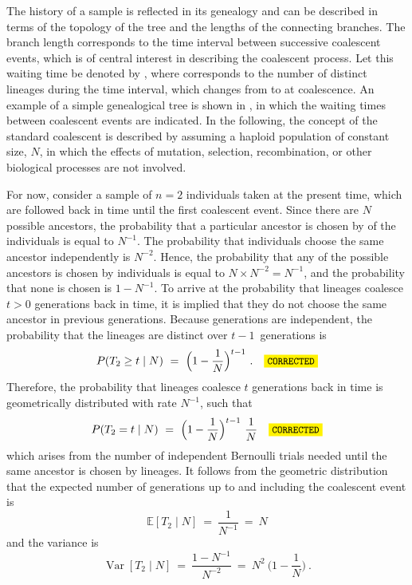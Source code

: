 %

%

The history of a sample is reflected in its genealogy and can be described in terms of the topology of the tree and the lengths of the connecting branches.
The branch length corresponds to the time interval between  successive coalescent events, which is of central interest in describing the coalescent process.
Let this waiting time be denoted by , where  corresponds to the number of distinct lineages during the time interval, which changes from  to  at coalescence.
An example of a simple genealogical tree is shown in , in which the waiting times between coalescent events are indicated.
In the following, the concept of the standard coalescent is described by assuming a haploid population of constant size, $N$, in which the effects of mutation, selection, recombination, or other biological processes are not involved.

For now, consider a sample of ${n=2}$ individuals taken at the present time, which are followed back in time until the first coalescent event.
Since there are $N$ possible ancestors, the probability that a particular ancestor is chosen by  of the individuals is equal to $N^{-1}$.
The probability that  individuals choose the same ancestor independently is $N^{-2}$.
Hence, the probability that any of the possible ancestors is chosen by  individuals is equal to ${N \times N^{-2} = N^{-1}}$, and the probability that none is chosen is ${1 - N^{-1}}$.
To arrive at the probability that  lineages coalesce $t>0$ generations back in time, it is implied that they do not choose the same ancestor in previous generations.
Because generations are independent, the probability that the  lineages are distinct over $t-1$~generations is
\begin{equation}
	P(T_2 \geq t \mid N) ~=~ \Big( 1 - \frac{1}{N} \Big)^{t-1}
	\ \text{.} \CorrectLabel
\end{equation}
Therefore, the probability that  lineages coalesce $t$ generations back in time is geometrically distributed with rate $N^{-1}$, such that
\begin{equation}\label{eq:coalprob}
	P(T_2 = t \mid N) ~=~ \Big( 1 - \frac{1}{N} \Big)^{t-1} ~ \frac{1}{N} \CorrectLabel
\end{equation}
which arises from the number of independent Bernoulli trials needed until the same ancestor is chosen by  lineages.
It follows from the geometric distribution that the expected number of generations up to and including the coalescent event is
\begin{equation}\label{eq:coal_2_exp}
	\mathbb{E}[T_2 \mid N] ~=~ \frac{1}{N^{-1}} ~=~ N
\end{equation}
and the variance is
\begin{equation}\label{eq:coal_2_var}
	\operatorname{Var}[T_2 \mid N] ~=~ \frac{1 - N^{-1}}{N^{-2}} ~=~ N^2 ~ \Big( 1 - \frac{1}{N} \Big)
	\ \text{.}
\end{equation}

